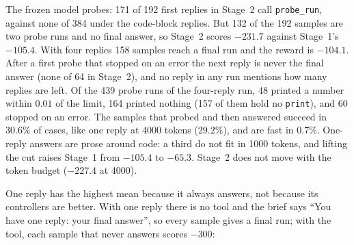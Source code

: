 \documentclass[11pt,a4paper]{article}
\begin{document}
\begin{center}\small
\resizebox{\linewidth}{!}{}
\end{center}

\begin{center}\small
\resizebox{\linewidth}{!}{}
\end{center}

\begin{center}\small
\resizebox{\linewidth}{!}{}
\end{center}

The frozen model probes: 171 of 192 first replies in Stage~2 call
\texttt{probe\_run}, against none of 384 under the code-block replies. But
132 of the 192 samples are two probe runs and no final answer, so Stage~2
scores $-231.7$ against Stage~1's $-105.4$. With four replies 158 samples
reach a final run and the reward is $-104.1$. After a first probe that
stopped on an error the next reply is never the final answer (none of 64 in
Stage~2), and no reply in any run mentions how many replies are left. Of the
439 probe runs of the four-reply run, 48 printed a number within $0.01$ of
the limit, 164 printed nothing (157 of them hold no \texttt{print}), and 60
stopped on an error. The samples that probed and then answered succeed in
$30.6\%$ of cases, like one reply at 4000 tokens ($29.2\%$), and are fast in
$0.7\%$. One-reply answers are prose around code: a third do not fit in
1000 tokens, and lifting the cut raises Stage~1 from $-105.4$ to $-65.3$.
Stage~2 does not move with the token budget ($-227.4$ at 4000).

One reply has the highest mean because it always answers, not because its
controllers are better. With one reply there is no tool and the brief says
``You have one reply: your final answer'', so every sample gives a final
run; with the tool, each sample that never answers scores $-300$:

\begin{center}\small

\end{center}
\end{document}
